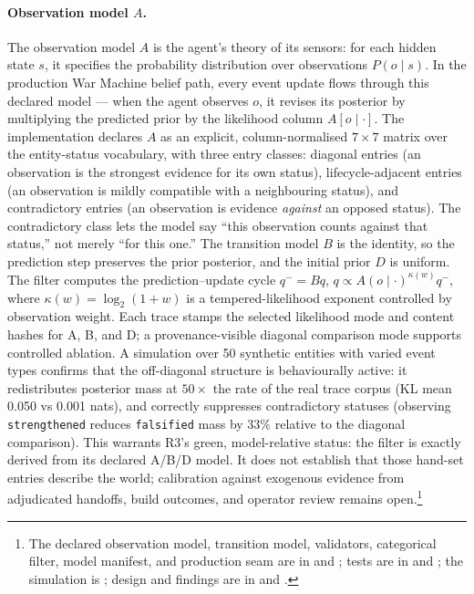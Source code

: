 \paragraph{Observation model $A$.} The observation model $A$ is the agent's theory of its sensors: for each hidden state $s$, it specifies the probability distribution over observations $P(o \mid s)$. In the production War Machine belief path, every event update flows through this declared model --- when the agent observes $o$, it revises its posterior by multiplying the predicted prior by the likelihood column $A[o \mid \cdot]$. The implementation declares $A$ as an explicit, column-normalised $7 \times 7$ matrix over the entity-status vocabulary, with three entry classes: diagonal entries (an observation is the strongest evidence for its own status), lifecycle-adjacent entries (an observation is mildly compatible with a neighbouring status), and contradictory entries (an observation is evidence \emph{against} an opposed status). The contradictory class lets the model say ``this observation counts against that status,'' not merely ``for this one.'' The transition model $B$ is the identity, so the prediction step preserves the prior posterior, and the initial prior $D$ is uniform. The filter computes the prediction--update cycle $q^- = Bq$, $q \propto A(o \mid \cdot)^{\kappa(w)} q^-$, where $\kappa(w) = \log_2(1+w)$ is a tempered-likelihood exponent controlled by observation weight. Each trace stamps the selected likelihood mode and content hashes for A, B, and D; a provenance-visible diagonal comparison mode supports controlled ablation. A simulation over 50 synthetic entities with varied event types confirms that the off-diagonal structure is behaviourally active: it redistributes posterior mass at $50{\times}$ the rate of the real trace corpus (KL mean 0.050 vs 0.001 nats), and correctly suppresses contradictory statuses (observing \texttt{strengthened} reduces \texttt{falsified} mass by 33\% relative to the diagonal comparison). This warrants R3's green, model-relative status: the filter is exactly derived from its declared A/B/D model. It does not establish that those hand-set entries describe the world; calibration against exogenous evidence from adjudicated handoffs, build outcomes, and operator review remains open.\footnote{The declared observation model, transition model, validators, categorical filter, model manifest, and production seam are in  and ; tests are in  and ; the simulation is ; design and findings are in  and .}

